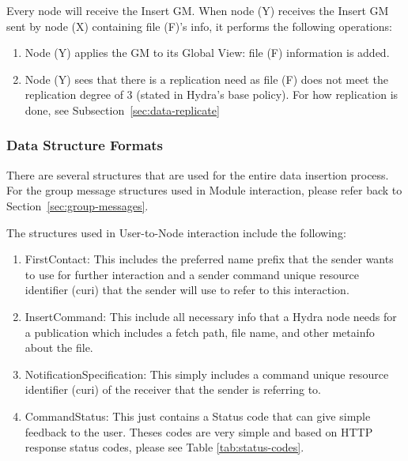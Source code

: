 Every node will receive the Insert GM. When node (Y) receives the Insert GM sent by node (X) containing file (F)'s info, it performs the following operations:
\begin{enumerate}
    \item Node (Y) applies the GM to its Global View: file (F) information is added.
    \item Node (Y) sees that there is a replication need as file (F) does not meet the replication degree of 3 (stated in Hydra's base policy). For how replication is done, see Subsection~\ref{sec:data-replicate}
\end{enumerate}

\subsubsection{Data Structure Formats}
There are several structures that are used for the entire data insertion process. For the group message structures used in Module interaction, please refer back to Section~\ref{sec:group-messages}.

The structures used in User-to-Node interaction include the following:
\begin{enumerate}
    \item FirstContact: This includes the preferred name prefix that the sender wants to use for further interaction and a sender command unique resource identifier (curi) that the sender will use to refer to this interaction.
    \item InsertCommand: This include all necessary info that a Hydra node needs for a publication which includes a fetch path, file name, and other metainfo about the file.
    \item NotificationSpecification: This simply includes a command unique resource identifier (curi) of the receiver that the sender is referring to.
    \item CommandStatus: This just contains a Status code that can give simple feedback to the user. Theses codes are very simple and based on HTTP response status codes, please see Table \ref{tab:status-codes}. %
\end{enumerate}